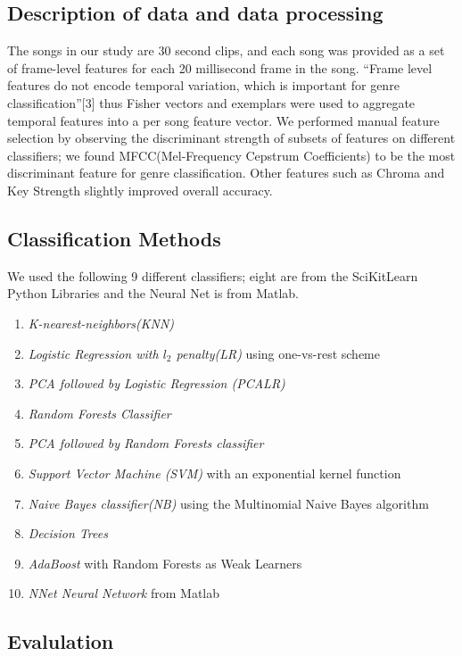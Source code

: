 \documentclass{article}
\begin{document}
\begin{multicols}{2}
\subsection{Description of data and data processing}
The songs in our study are 30 second clips, and each song was provided as a set of frame-level features for each 20 millisecond frame in the song. ``Frame level features do not encode temporal variation, which is important for genre classification''[3] thus Fisher vectors and exemplars were used to aggregate temporal features into a per song feature vector. 
We performed manual feature selection by observing the discriminant strength of subsets of features on different classifiers; we found MFCC(Mel-Frequency Cepstrum Coefficients) to be the most discriminant feature for genre classification. Other features such as Chroma and Key Strength slightly improved overall accuracy.

\subsection{Classification Methods}
We used the following 9 different classifiers; eight are from the SciKitLearn Python Libraries and the Neural Net is from Matlab. 
\begin{enumerate}
    \item \textit{K-nearest-neighbors(KNN)} 
    \item \textit{Logistic Regression with $l_2$ penalty(LR)} using one-vs-rest scheme 
    \item \textit{PCA followed by Logistic Regression (PCALR)}
    \item \textit{Random Forests Classifier}
    \item \textit{PCA followed by Random Forests classifier}
    \item \textit{Support Vector Machine (SVM)} with an exponential kernel function
    \item \textit{Naive Bayes classifier(NB)} using the Multinomial Naive Bayes algorithm
    \item \textit{Decision Trees} 
    \item \textit{AdaBoost} with Random Forests as Weak Learners
    \item \textit{NNet Neural Network} from Matlab
\end{enumerate}
 
\subsection{Evalulation}


\end{multicols}
\end{document}
